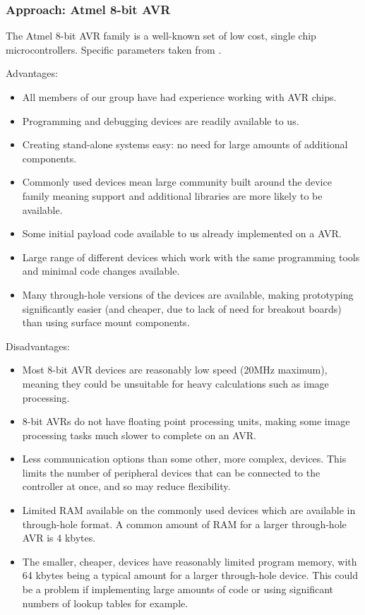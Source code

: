 \subsubsection{Approach: Atmel 8-bit AVR}
\label{sec:desappr:avr}
The Atmel 8-bit AVR family is a well-known set of low cost, single chip microcontrollers. Specific parameters taken from \cite{megaAVR_parameters}.

Advantages:
\begin{itemize}
\item All members of our group have had experience working with AVR chips.

\item Programming and debugging devices are readily available to us.

\item Creating stand-alone systems easy: no need for large amounts of additional components.

\item Commonly used devices mean large community built around the device family meaning support and additional libraries are more likely to be available.

\item Some initial payload code available to us already implemented on a AVR.

\item Large range of different devices which work with the same programming tools and minimal code changes available.

\item Many through-hole versions of the devices are available, making prototyping significantly easier (and cheaper, due to lack of need for breakout boards) than using surface mount components.
\end{itemize}

Disadvantages:
\begin{itemize}
\item Most 8-bit AVR devices are reasonably low speed (20MHz maximum), meaning they could be unsuitable for heavy calculations such as image processing.

\item 8-bit AVRs do not have floating point processing units, making some image processing tasks much slower to complete on an AVR.

\item Less communication options than some other, more complex, devices. This limits the number of peripheral devices that can be connected to the controller at once, and so may reduce flexibility.

\item Limited RAM available on the commonly used devices which are available in through-hole format. A common amount of RAM for a larger through-hole AVR is 4 kbytes.

\item The smaller, cheaper, devices have reasonably limited program memory, with 64 kbytes being a typical amount for a larger through-hole device. This could be a problem if implementing large amounts of code or using significant numbers of lookup tables for example.
\end{itemize}
	
